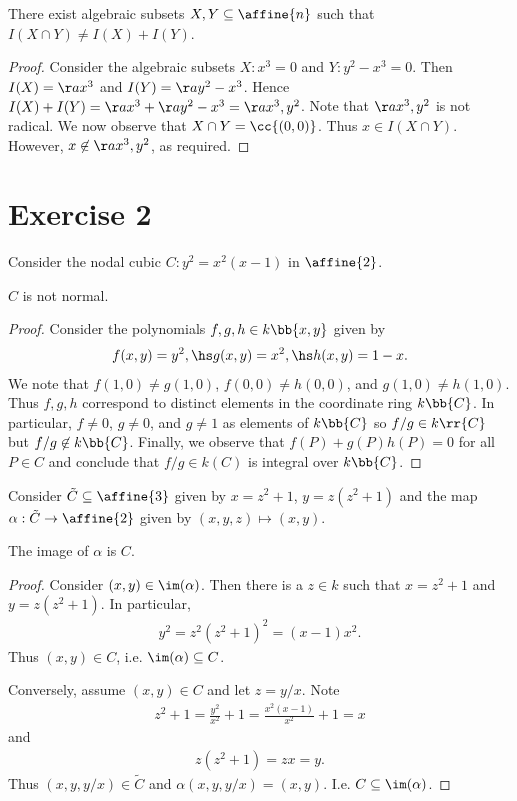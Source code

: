 \documentclass{article}
\begin{document}
\begin{claim*}[3]
  There exist algebraic subsets $X,Y\subseteq \affine{n}$ such that $I(X\cap Y)\neq I(X)+I(Y)$.
  \begin{proof}
    Consider the algebraic subsets $X:x^3=0$ and $Y:y^2-x^3=0$. Then $I(X)=\aa{x^3}$
    and $I(Y)=\aa{y^2-x^3}$. Hence $I(X)+I(Y)=\aa{x^3}+\aa{y^2-x^3}=\aa{x^3,y^2}$.
    Note that $\aa{x^3,y^2}$ is not radical.
    We now observe that $X\cap Y=\cc{(0,0)}$. Thus $x\in I(X\cap Y)$. However,
    $x\not\in\aa{x^3,y^2}$, as required.
  \end{proof}
\end{claim*}

\section*{Exercise 2}

Consider the nodal cubic $C:y^2=x^2(x-1)$ in $\affine{2}$.

\begin{claim*}[1]
  $C$ is not normal.
  \begin{proof}
    Consider the polynomials $f,g,h\in k\bb{x,y}$ given by
    \begin{align*}
      f(x,y)=y^2,\hs g(x,y)=x^2,\hs h(x,y)= 1-x.
    \end{align*}
    We note that $f(1,0)\neq g(1,0)$, $f(0,0)\neq h(0,0)$, and $g(1,0)\neq h(1,0)$.
    Thus $f,g,h$ correspond to distinct elements in the coordinate ring $k\bb{C}$.
    In particular, $f\neq 0$, $g\neq 0$, and $g\neq 1$ as elements of $k\bb{C}$
    so $f/g\in k\rr{C}$ but $f/g\not\in k\bb{C}$.
    Finally, we observe that $f(P)+g(P)h(P) = 0$ for all $P\in C$ and conclude that
    $f/g\in k(C)$ is integral over $k\bb{C}$.
  \end{proof}
\end{claim*}

Consider $\tilde C\subseteq \affine{3}$ given by $x=z^2+1$, $y=z(z^2+1)$
and the map $\alpha:\tilde C\to\affine{2}$ given by $(x,y,z)\mapsto (x,y)$.

\begin{claim*}[2]
  The image of $\alpha$ is $C$.
  \begin{proof}
    Consider $(x,y)\in\im(\alpha)$. Then there is a $z\in k$ such that $x=z^2+1$ and $y=z(z^2+1)$.
    In particular,
    \begin{align*}
      y^2 = z^2(z^2+1)^2=(x-1)x^2.
    \end{align*}
    Thus $(x,y)\in C$, i.e. $\im(\alpha)\subseteq C$.

    Conversely, assume $(x,y)\in C$ and let $z=y/x$. Note
    \begin{align*}
      z^2 + 1 = \frac{y^2}{x^2}+1 = \frac{x^2(x-1)}{x^2} + 1 = x
    \end{align*}
    and
    \begin{align*}
      z(z^2+1) = zx = y.
    \end{align*}
    Thus $(x,y,y/x)\in\tilde C$ and $\alpha(x,y,y/x)=(x,y)$. I.e. $C\subseteq\im(\alpha)$.
  \end{proof}
\end{claim*}
\end{document}
